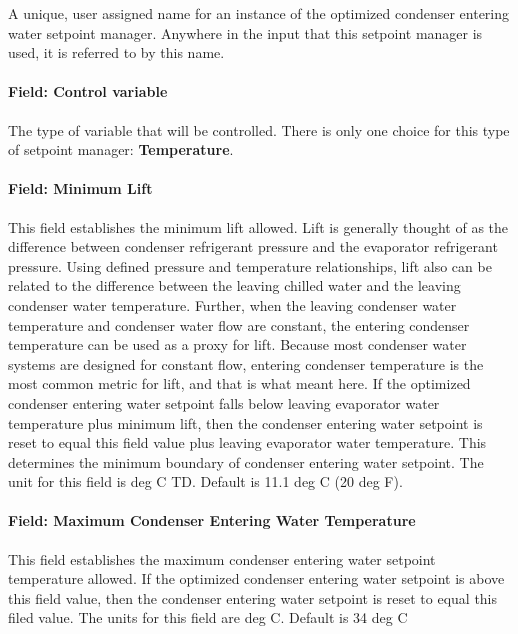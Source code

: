 A unique, user assigned name for an instance of the optimized condenser entering water setpoint manager. Anywhere in the input that this setpoint manager is used, it is referred to by this name.

\paragraph{Field: Control variable}\label{field-control-variable-18}

The type of variable that will be controlled. There is only one choice for this type of setpoint manager: \textbf{Temperature}.

\paragraph{Field: Minimum Lift}\label{field-minimum-lift-1}

This field establishes the minimum lift allowed. Lift is generally thought of as the difference between condenser refrigerant pressure and the evaporator refrigerant pressure. Using defined pressure and temperature relationships, lift also can be related to the difference between the leaving chilled water and the leaving condenser water temperature. Further, when the leaving condenser water temperature and condenser water flow are constant, the entering condenser temperature can be used as a proxy for lift. Because most condenser water systems are designed for constant flow, entering condenser temperature is the most common metric for lift, and that is what meant here. If the optimized condenser entering water setpoint falls below leaving evaporator water temperature plus minimum lift, then the condenser entering water setpoint is reset to equal this field value plus leaving evaporator water temperature. This determines the minimum boundary of condenser entering water setpoint. The unit for this field is deg C TD. Default is 11.1 deg C (20 deg F).

\paragraph{Field: Maximum Condenser Entering Water Temperature}\label{field-maximum-condenser-entering-water-temperature}

This field establishes the maximum condenser entering water setpoint temperature allowed. If the optimized condenser entering water setpoint is above this field value, then the condenser entering water setpoint is reset to equal this filed value. The units for this field are deg C. Default is 34 deg C

